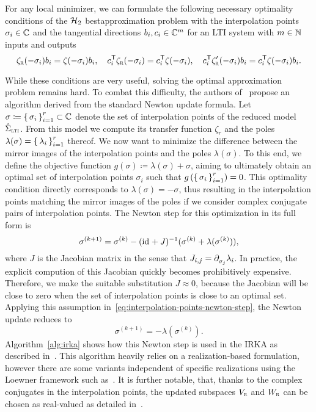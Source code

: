 For any local minimizer, we can formulate the following necessary optimality conditions of the $\mcl{H}_2$ bestapproximation problem with the interpolation points $\sigma_i \in \bb{C}$ and the tangential directions $b_i, c_i \in \bb{C}^{m}$ for an \ac{LTI} system with $m \in \bb{N}$ inputs and outputs
\begin{equation}\label{eq:h2-optimality-conditions}
    \zeta_\msc{r}(- \sigma_i) b_i = \zeta(- \sigma_i) b_i,\quad c_i\trans \zeta_\msc{r}(- \sigma_i) = c_i\trans \zeta(- \sigma_i),\quad c_i\trans \zeta'_\msc{r}(- \sigma_i) b_i = c_i\trans \zeta(- \sigma_i) b_i.
\end{equation}

While these conditions are very useful, solving the optimal approximation problem remains hard.
To combat this difficulty, the authors of~\cite{Gugercin2008} propose an algorithm derived from the standard Newton update formula.
Let $\sigma \coloneqq {\sset{\sigma_i}}_{i = 1}^r \subset \bb{C}$ denote the set of interpolation points of the reduced model $\hat{\Sigma}_\msc{lti}$.
From this model we compute its transfer function $\zeta_r$ and the poles $\lambda(\sigma) = {\sset{\lambda_i}}_{i = 1}^r$ thereof.
We now want to minimize the difference between the mirror images of the interpolation points and the poles $\lambda(\sigma)$.
To this end, we define the objective function $g(\sigma) \coloneqq \lambda(\sigma) + \sigma$, aiming to ultimately obtain an optimal set of interpolation points $\sigma_i$ such that $g\left( {\sset{\sigma_i}}_{i = 1}^r \right) = 0$.
This optimality condition directly corresponds to $\lambda(\sigma) = -\sigma$, thus resulting in the interpolation points matching the mirror images of the poles if we consider complex conjugate pairs of interpolation points.
The Newton step for this optimization in its full form is
\begin{equation}\label{eq:interpolation-points-newton-step}
    \sigma^{(k + 1)} = \sigma^{(k)} - (\id + J)\inv (\sigma^{(k)} + \lambda(\sigma^{(k)})),
\end{equation}
where $J$ is the Jacobian matrix in the sense that $J_{i, j} = \pd[\sigma_j]{} \lambda_i$.
In practice, the explicit compution of this Jacobian quickly becomes prohibitively expensive.
Therefore, we make the suitable substitution $J \approx 0$, because the Jacobian will be close to zero when the set of interpolation points is close to an optimal set.
Applying this assumption in~\eqref{eq:interpolation-points-newton-step}, the Newton update reduces to
\begin{equation*}
    \sigma^{(k + 1)} = - \lambda(\sigma^{(k)}).
\end{equation*}
Algorithm~\ref{alg:irka} shows how this Newton step is used in the \acf{IRKA} as described in~\cite[Algorithm~4.1]{Gugercin2008}.
This algorithm heavily relies on a realization-based formulation, however there are some variants independent of specific realizations using the Loewner framework such as~\cite[Algorithm~7.2]{Beattie2017}.
It is further notable, that, thanks to the complex conjugates in the interpolation points, the updated subspaces $V_\msc{r}$ and $W_\msc{r}$ can be chosen as real-valued as detailed in~\cite[Remark~4]{Gugercin2012}.


